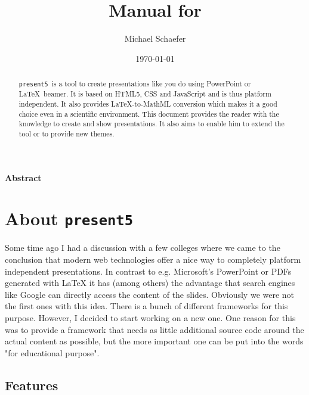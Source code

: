 \documentclass{scrartcl}
\author{Michael Schaefer}
\date{\today}
\title{Manual for \present}
\newcommand{\present}{\code{present5}}
\newcommand{\code}[1]{{\tt #1}}
\begin{document}
\maketitle
\begin{center}{\bf Abstract}\end{center}
\begin{abstract}
  \present~is a tool to create presentations like you do using PowerPoint or \LaTeX~beamer. It is based on HTML5, CSS and JavaScript and is thus platform independent. It also provides \LaTeX-to-MathML conversion which makes it a good choice even in a scientific environment. This document provides the reader with the knowledge to create and show presentations. It also aims to enable him to extend the tool or to provide new themes.
\end{abstract}
\newpage

\tableofcontents
\newpage




\section{About \present}
\label{section:aboutPresent5} 


Some time ago I had a discussion with a few colleges where we came to the conclusion that modern web technologies offer a nice way to completely platform independent presentations. In contrast to e.g. Microsoft's PowerPoint or PDFs generated with LaTeX it has (among others) the advantage that search engines like Google can directly access the content of the slides. Obviously we were not the first ones with this idea. There is a bunch of different frameworks for this purpose. However, I decided to start working on a new one. One reason for this was to provide a framework that needs as little additional source code around the actual content as possible, but the more important one can be put into the words "for educational purpose".


\subsection{Features}
\label{subsection:features} 
\end{document}

